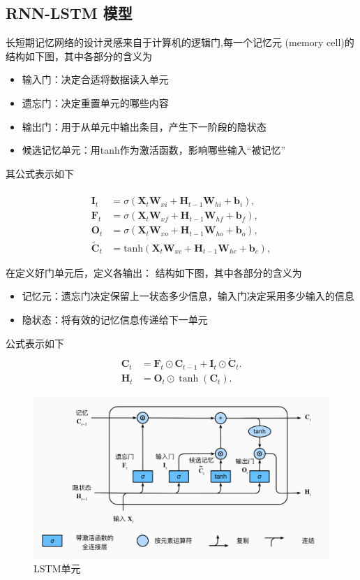 \documentclass{article}
\begin{document}
\begin{spacing}{1.1}
	\subsection{RNN-LSTM 模型}
	\hspace{1.4em}
	长短期记忆网络的设计灵感来自于计算机的逻辑门,每一个记忆元 (memory cell)的结构如下图，其中各部分的含义为
	\begin{itemize}
		\item 输入门：决定合适将数据读入单元
		\item 遗忘门：决定重置单元的哪些内容
		\item 输出门：用于从单元中输出条目，产生下一阶段的隐状态
		\item 候选记忆单元：用tanh作为激活函数，影响哪些输入“被记忆”
	\end{itemize}
	
	其公式表示如下
	
	$$
	\begin{aligned}
	 \\ \mathbf{I}_t &= \sigma(\mathbf{X}_t \mathbf{W}_{xi} + \mathbf{H}_{t-1} \mathbf{W}_{hi} + \mathbf{b}_i),
	 \\ \mathbf{F}_t &= \sigma(\mathbf{X}_t \mathbf{W}_{xf} + \mathbf{H}_{t-1} \mathbf{W}_{hf} + \mathbf{b}_f),
	 \\ \mathbf{O}_t &= \sigma(\mathbf{X}_t \mathbf{W}_{xo} + \mathbf{H}_{t-1} \mathbf{W}_{ho} + \mathbf{b}_o),
	 \\ \tilde{\mathbf{C}}_t &= \text{tanh}(\mathbf{X}_t \mathbf{W}_{xc} + \mathbf{H}_{t-1} \mathbf{W}_{hc} + \mathbf{b}_c),
	\end{aligned}
	$$
	
	在定义好门单元后，定义各输出：
	结构如下图，其中各部分的含义为
	\begin{itemize}
		\item 记忆元：遗忘门决定保留上一状态多少信息，输入门决定采用多少输入的信息
		\item 隐状态：将有效的记忆信息传递给下一单元
	\end{itemize}

	公式表示如下
	$$
	\begin{aligned}
	\\ \mathbf{C}_t &= \mathbf{F}_t \odot \mathbf{C}_{t-1} + \mathbf{I}_t \odot \tilde{\mathbf{C}}_t.
	\\ \mathbf{H}_t &= \mathbf{O}_t \odot \tanh(\mathbf{C}_t).
	\end{aligned}
	$$	
	\begin{figure}[h]
		\centering
		\includegraphics[width=0.8\linewidth]{pic/LSTM.png}
		\caption{LSTM单元}
	\end{figure}
	

\end{spacing}
\end{document}
